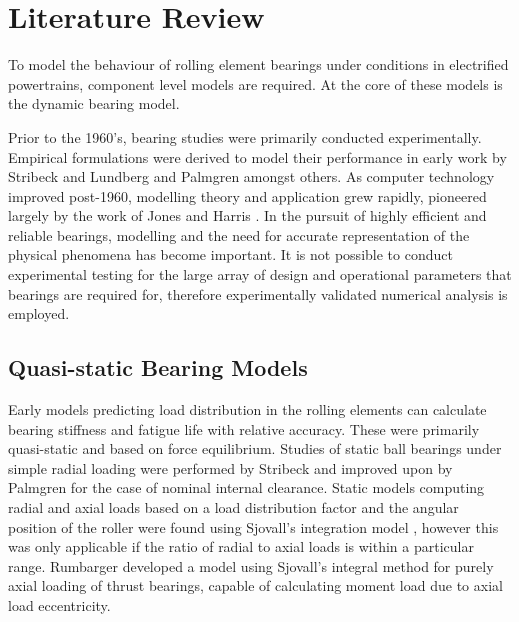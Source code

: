 \chapter{Literature Review}
\label{Literature Review}

To model the behaviour of rolling element bearings under conditions in electrified powertrains, component level models are required. At the core of these models is the dynamic bearing model.

Prior to the 1960’s, bearing studies were primarily conducted experimentally. Empirical formulations were derived to model their performance in early work by Stribeck \cite{Stribeck1907} and Lundberg and Palmgren \cite{Lundberg1952} \cite{Palmgren1959} amongst others. As computer technology improved post-1960, modelling theory and application grew rapidly, pioneered largely by the work of Jones \cite{Jones1960} and Harris \cite{Harris1984}. In the pursuit of highly efficient and reliable bearings, modelling and the need for accurate representation of the physical phenomena has become important. It is not possible to conduct experimental testing for the large array of design and operational parameters that bearings are required for, therefore experimentally validated numerical analysis is employed.

\section{Quasi-static Bearing Models}

Early models predicting load distribution in the rolling elements can calculate bearing stiffness and fatigue life with relative accuracy. These were primarily quasi-static and based on force equilibrium. Studies of static ball bearings under simple radial loading were performed by Stribeck \cite{Stribeck1907} and improved upon by Palmgren \cite{Palmgren1959} for the case of nominal internal clearance. Static models computing radial and axial loads based on a load distribution factor and the angular position of the roller were found using Sjovall’s integration model \cite{Sjovall1933}, however this was only applicable if the ratio of radial to axial loads is within a particular range. Rumbarger \cite{JRumbarger1962} developed a model using Sjovall’s integral method for purely axial loading of thrust bearings, capable of calculating moment load due to axial load eccentricity. 

